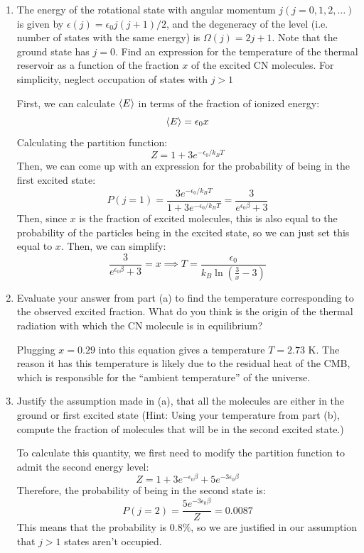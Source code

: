 \documentclass[10pt]{article}
\begin{document}
	 \begin{enumerate}[label=\alph*)]
		\item The energy of the rotational state with angular momentum \(j (j = 0, 1, 2, \dots)\) is 
			given by \(\epsilon(j) = \epsilon_0 j(j+1) / 2\), and the degeneracy of the level (i.e. 
			number of states with the same energy) is \(\Omega(j) = 2j+1\). Note that 
			the ground state has \(j = 0\). Find an expression for the temperature of the thermal reservoir
			as a function of the fraction \(x\) of the excited CN molecules. For simplicity, neglect 
			occupation of states with \(j > 1\) 

			\begin{solution}
				First, we can calculate \( \langle E \rangle \) in terms of the fraction of ionized energy:
				\[
					\langle E \rangle = \epsilon_0 x
				\] 
				Calculating the partition function:
				\[
					Z = 1 + 3e^{-\epsilon_0 / k_BT}
				\] 
				Then, we can come up with an expression for the probability of being in the first excited state:
				\[
					P(j = 1) =  \frac{3e^{-\epsilon_0 /k_B T}}{1 + 3e^{-\epsilon_0/k_BT}} = \frac{3}{e^{\epsilon_0 \beta} + 3}
				\]
				Then, since \( x \) is the fraction of excited molecules, this is also equal to the probability 
				of the particles being in the excited state, so we can just set this equal to \( x \). Then, 
				we can simplify:
				\[
				\frac{3}{e^{\epsilon_0 \beta} + 3} = x \implies T = \frac{\epsilon_0}{k_B \ln \left( \frac{3}{x} - 3 \right) }
				\] 
			\end{solution}
		\item Evaluate your answer from part (a) to find the temperature corresponding to the 
			observed excited fraction. What do you think is the origin of the thermal 
			radiation with which the CN molecule is in equilibrium?

			\begin{solution}
				Plugging \( x = 0.29 \) into this equation gives a temperature \( T = \text{2.73 K} \). The 
				reason it has this temperature is likely due to the residual heat of the CMB, which is responsible
				for the ``ambient temperature'' of the universe.  
			\end{solution}
		\item Justify the assumption made in (a), that all the molecules are either in the ground or first 
			excited state (Hint: Using your temperature from part (b), compute the fraction of molecules 
			that will be in the second excited state.) 

			\begin{solution}
				To calculate this quantity, we first need to modify the partition function to admit the 
				second energy level:
				\[
				Z = 1 + 3e^{-\epsilon_0 \beta} + 5e^{-3\epsilon_0 \beta}
				\] 
				Therefore, the probability of being in the second state is:
				\[
				P(j = 2) = \frac{5e^{-3\epsilon_0 \beta}}{Z} = 0.0087
				\] 
				This means that the probability is \( 0.8\% \), so we are justified in our assumption that 
				\( j > 1 \) states aren't occupied. 
			\end{solution}
	\end{enumerate}
	\pagebreak
\end{document}
